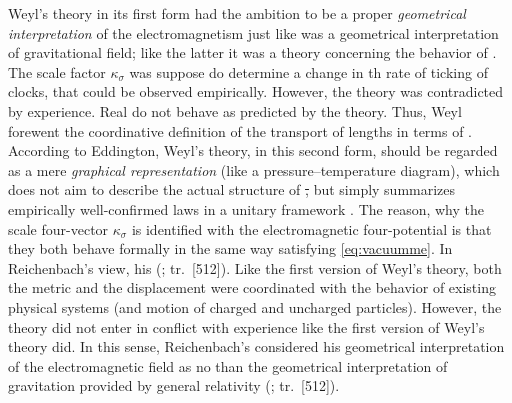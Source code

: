 \documentclass[submitted]{article}
\renewcommand{\rzlp}[2]{(\cite[#1]{Reichenbach1928}; tr.\ #2)\xspace}
\renewcommand{\rzlap}[2]{(\cite[#1]{Reichenbach1928}; tr.\ [#2])\xspace}
\begin{document}
Weyl's theory in its first form had the ambition to be a proper \emph{geometrical interpretation} of the electromagnetism just like \gr was a geometrical interpretation of gravitational field; like the latter it was a theory concerning the behavior of \rac. The scale factor $\kappa_\sigma$ was suppose do determine a change in th rate of ticking of clocks, that could be observed empirically. However, the theory was contradicted by experience. Real \rac do not behave as predicted by the theory. Thus, Weyl forewent the coordinative definition of the transport of lengths in terms of \rac. According to Eddington, Weyl's theory, in this second form, should be regarded as a mere \emph{graphical representation} (like a pressure–temperature diagram), which does not aim to describe the actual structure of \st, but simply summarizes empirically well-confirmed laws in a unitary framework \citep[see][\S8.3]{Ryckman2005}. The reason, why the scale four-vector $\kappa_\sigma$ is identified with the electromagnetic four-potential is that they both behave formally in the same way satisfying \cref{eq:vacuumme}. In Reichenbach's view, his  \rzlap{365}{512}. Like the first version of Weyl's theory, both the metric and the displacement were coordinated with the behavior of existing physical systems (\rac and motion of charged and uncharged particles). However, the theory did not enter in conflict with experience like the first version of Weyl's theory did. In this sense, Reichenbach's considered his geometrical interpretation of the electromagnetic field as no  than the geometrical interpretation of gravitation provided by general relativity \rzlap{366}{512}.

\end{document}
